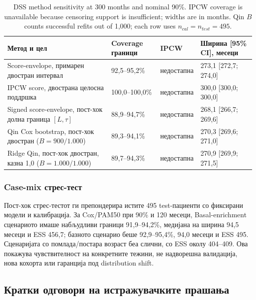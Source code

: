 \documentclass[12pt]{article}
\begin{document}
\begin{table}[ht]
\centering
\caption{DSS method sensitivity at 300 months and nominal 90\%. IPCW coverage is unavailable because censoring support is insufficient; widths are in months. Qin $B$ counts successful refits out of 1,000; each row uses $n_{cal}=n_{test}=495$.}
\label{tab:dss-method-sensitivities-300}
\footnotesize
\setlength{\tabcolsep}{3pt}
\begin{tabular}{p{}p{}p{}p{}}
\hline
Метод и цел & Coverage граници & IPCW & Ширина [95\% CI], месеци \\
\hline
Score-envelope, примарен двостран интервал & 92,5--95,2\% & недостапна & 273,1 [272,7; 274,0] \\
IPCW score, двострана целосна поддршка & 100,0--100,0\% & недостапна & 300,0 [300,0; 300,0] \\
Signed score-envelope, пост-хок долна граница $[L,\tau]$ & 88,9--94,7\% & недостапна & 268,1 [266,7; 269,6] \\
Qin Cox bootstrap, пост-хок двостран ($B=900/1.000$) & 89,3--94,1\% & недостапна & 270,3 [269,6; 271,0] \\
Ridge Qin, пост-хок двостран, казна 1,0 ($B=1.000/1.000$) & 89,7--94,3\% & недостапна & 270,9 [269,9; 271,5] \\
\hline
\end{tabular}
\end{table}
\subsubsection{Case-mix стрес-тест}

Пост-хок стрес-тестот ги препондерира истите 495 test-пациенти со фиксирани
модели и калибрација. За Cox/PAM50 при 90\% и 120 месеци, Basal-enrichment
сценариото имаше набљудливи граници 91,9--94,2\%, медијана на ширина 94,5 месеци
и ESS 456,7; базното сценарио беше 92,9--95,4\%, 94,0 месеци и ESS 495.
Сценаријата со помлада/постара возраст беа слични, со ESS околу 404--409.
Ова покажува чувствителност на конкретните тежини, не надворешна валидација,
нова кохорта или гаранција под distribution shift.

\clearpage
\subsection{Кратки одговори на истражувачките прашања}
\end{document}
